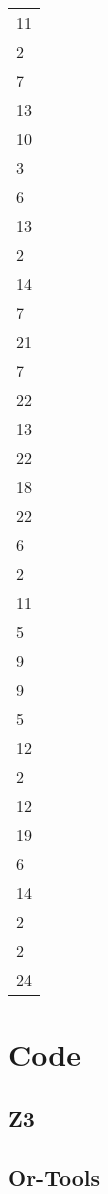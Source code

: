 \documentclass{IEEEtran}
\begin{document}
\begin{table}[]
\begin{tabular}{l}
    11 \\
    2  \\
    7  \\
    13 \\
    10 \\
    3  \\
    6  \\
    13 \\
    2  \\
    14 \\
    7  \\
    21 \\
    7  \\
    22 \\
    13 \\
    22 \\
    18 \\
    22 \\
    6  \\
    2  \\
    11 \\
    5  \\
    9  \\
    9  \\
    5  \\
    12 \\
    2  \\
    12 \\
    19 \\
    6  \\
    14 \\
    2  \\
    2  \\
    24
    \end{tabular}
    \end{table}
\section{Code}
\subsection{Z3}
\subsection{Or-Tools}
\end{document}
